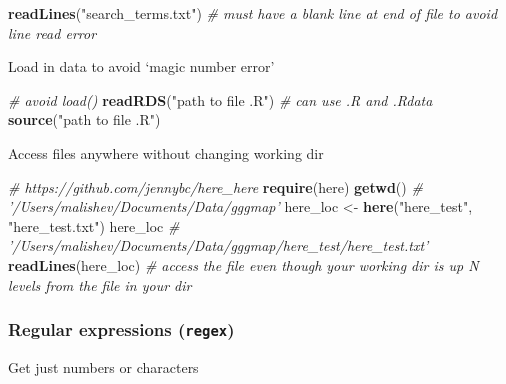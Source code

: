 \documentclass[10,portrait]{article}
\newenvironment{Shaded}{\begin{snugshade}}{\end{snugshade}}
\newcommand{\KeywordTok}[1]{\textcolor[rgb]{0.13,0.29,0.53}{\textbf{#1}}}
\newcommand{\StringTok}[1]{\textcolor[rgb]{0.31,0.60,0.02}{#1}}
\newcommand{\CommentTok}[1]{\textcolor[rgb]{0.56,0.35,0.01}{\textit{#1}}}
\newcommand{\NormalTok}[1]{#1}
\begin{document}
\begin{Shaded}
\begin{Highlighting}[]
\KeywordTok{readLines}\NormalTok{(}\StringTok{"search_terms.txt"}\NormalTok{)  }\CommentTok{# must have a blank line at end of file to avoid line read error  }
\end{Highlighting}
\end{Shaded}

Load in data to avoid `magic number error'

\begin{Shaded}
\begin{Highlighting}[]
\CommentTok{# avoid load()}
\KeywordTok{readRDS}\NormalTok{(}\StringTok{"path to file .R"}\NormalTok{)  }\CommentTok{# can use .R and .Rdata}
\KeywordTok{source}\NormalTok{(}\StringTok{"path to file .R"}\NormalTok{)}
\end{Highlighting}
\end{Shaded}

Access files anywhere without changing working dir

\begin{Shaded}
\begin{Highlighting}[]
\CommentTok{# https://github.com/jennybc/here_here}
\KeywordTok{require}\NormalTok{(here)}
\KeywordTok{getwd}\NormalTok{()}
\CommentTok{# '/Users/malishev/Documents/Data/gggmap'}
\NormalTok{here_loc <-}\StringTok{ }\KeywordTok{here}\NormalTok{(}\StringTok{"here_test"}\NormalTok{, }\StringTok{"here_test.txt"}\NormalTok{)}
\NormalTok{here_loc}
\CommentTok{# '/Users/malishev/Documents/Data/gggmap/here_test/here_test.txt'}
\KeywordTok{readLines}\NormalTok{(here_loc)  }\CommentTok{# access the file even though your working dir is up N levels from the file in your dir }
\end{Highlighting}
\end{Shaded}

\subsubsection{\texorpdfstring{Regular expressions
(\texttt{regex})}{Regular expressions (regex)}}\label{regular-expressions-regex}

Get just numbers or characters
\end{document}
